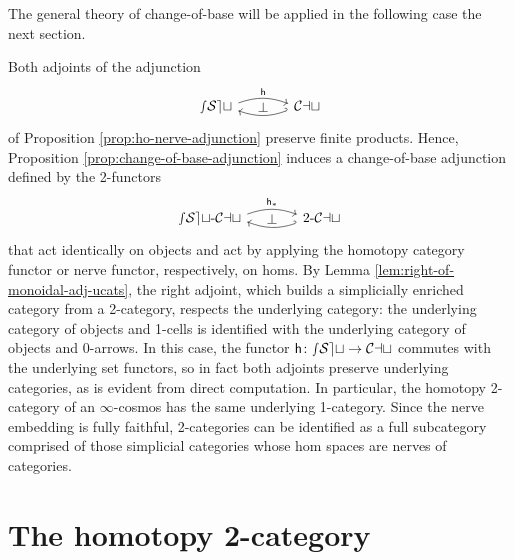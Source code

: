 

The general theory of change-of-base will be applied in the following case the next section.


\begin{ex}\label{ex:nerve-ho-change-of-base}
Both adjoints of the adjunction
\[
\begin{tikzcd}[column sep=large]
\sSet \arrow[r, bend left=20, start anchor=10, end anchor=170, "\ho"] \arrow[r, phantom, "\bot"] & \Cat \arrow[l, bend left=20, start anchor=190, end anchor=-10, hook']
\end{tikzcd}
\] of Proposition \ref{prop:ho-nerve-adjunction} preserve finite products. Hence, Proposition \ref{prop:change-of-base-adjunction} induces a change-of-base adjunction defined by the 2-functors
\[
\begin{tikzcd}[column sep=large]
 \sCat  \arrow[r, bend left=20, start anchor=7, end anchor=170, "\ho_*"] \arrow[r, phantom, "\bot"] &\twoCat\arrow[l, bend left=20, start anchor=190, end anchor=-5, hook']
\end{tikzcd}
\]
that act identically on objects and act by applying the homotopy category functor or nerve functor, respectively, on homs. By Lemma \ref{lem:right-of-monoidal-adj-ucats}, the right adjoint, which builds a simplicially enriched category from a 2-category, respects the underlying category: the underlying category of objects and 1-cells is identified with the underlying category of objects and 0-arrows. In this case, the functor ${\mathord{\mathsf{h}}} \colon {\mathord{\mathcal{sSet}}} \to {\mathord{\mathcal{Cat}}}$ commutes with the underlying set functors, so in fact both adjoints preserve underlying categories, as is evident from direct computation. In particular, the homotopy 2-category of an $\infty$-cosmos has the same underlying 1-category. Since the nerve embedding is fully faithful, 2-categories can be identified as a full subcategory comprised of those simplicial categories whose hom spaces are nerves of categories.
\end{ex}


\section{The homotopy 2-category}\label{sec:htpy-2-cat}


